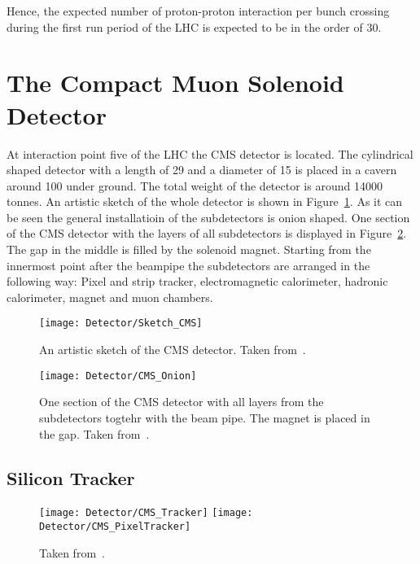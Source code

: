 Hence, the expected number of proton-proton interaction per bunch crossing during the first run period of the LHC is expected to be in the order of 30.

\section{The Compact Muon Solenoid Detector \label{LHCCMSCMS}}

At interaction point five of the LHC the CMS detector is located. The cylindrical shaped detector with a length of 29\m{} and a diameter of 15\m{} is placed in a cavern around 100\m{} under ground. The total weight of the detector is around 14000 tonnes. An artistic sketch of the whole detector is shown in Figure~\ref{plot:LHCCMSWholeCMS}. As it can be seen the general installatioin of the subdetectors is onion shaped. One section of the CMS detector with the layers of all subdetectors is displayed in Figure~\ref{plot:LHCCMSOnionCMS}. The gap in the middle is filled by the solenoid magnet. Starting from the innermost point after the beampipe the subdetectors are arranged in the following way: Pixel and strip tracker, electromagnetic calorimeter, hadronic calorimeter, magnet and muon chambers.

\begin{figure}[!Hhtb]
  \centering
  \texttt{[image: Detector/Sketch\_CMS]}
  \caption[Artistic sketch of the CMS detector]{An artistic sketch of the CMS detector. Taken from~. \label{plot:LHCCMSWholeCMS}}
\end{figure}

\begin{figure}[!Hhtb]
  \centering
  \texttt{[image: Detector/CMS\_Onion]}
  \caption[One section of the CMS detector with all layers]{One section of the CMS detector with all layers from the subdetectors togtehr with the beam pipe. The magnet is placed in the gap. Taken from~. \label{plot:LHCCMSOnionCMS}}
\end{figure}


\subsection{Silicon Tracker}

\begin{figure}[!Hhtb]
  \centering
  \texttt{[image: Detector/CMS\_Tracker]}
  \texttt{[image: Detector/CMS\_PixelTracker]}
  \caption[]{Taken from~. \label{plot:LHCCMSTrackerCMS}}
\end{figure}

